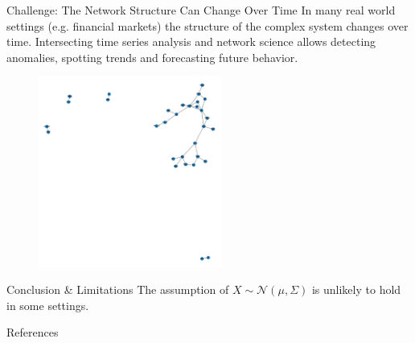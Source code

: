 \documentclass{beamer}
\begin{document}
\begin{frame}{Challenge: The Network Structure Can Change Over Time}
    In many real world settings (e.g. financial markets) the structure of the complex system changes over time.
    Intersecting time series analysis and network science allows detecting anomalies, spotting trends and forecasting future behavior.
    \begin{figure}
       \includegraphics[width=6cm]{NetworkGraph.png}
       \caption{}
       \label{fig:network_evolution}
  \end{figure}
\end{frame}

\begin{frame}{Conclusion \& Limitations}
    The assumption of $X \sim \mathcal{N}(\mu, \Sigma)$ is unlikely to hold in some settings.
\end{frame}

\begin{frame}{References}
    \nocite{*}
    
    
\end{frame}
\end{document}
